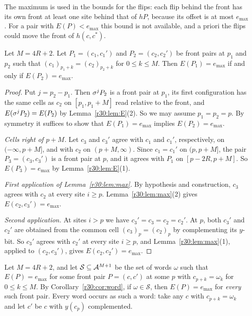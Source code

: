The maximum is used in the bounds for the flips: each flip behind the front has its own front at least one site behind that of $hP$, because its offset is at most $e_{\max}$. For a pair with $E(P)<e_{\max}$ this bound is not available, and a priori the flips could move the front of $h(c,c^*)$.

\begin{corollary}\label{r30:cor:word}
Let $M=4R+2$. Let $P_1=(c_1,c_1')$ and $P_2=(c_2,c_2')$ be front pairs at $p_1$ and $p_2$ such that $(c_1)_{p_1+k}=(c_2)_{p_2+k}$ for $0\le k\le M$. Then $E(P_1)=e_{\max}$ if and only if $E(P_2)=e_{\max}$.
\end{corollary}

\begin{proof}
Put $j=p_2-p_1$. Then $\sigma^jP_2$ is a front pair at $p_1$, its first configuration has the same cells as $c_2$ on $[p_1,p_1+M]$ read relative to the front, and $E(\sigma^jP_2)=E(P_2)$ by Lemma~\ref{r30:lem:E}(2). So we may assume $p_1=p_2=p$. By symmetry it suffices to show that $E(P_1)=e_{\max}$ implies $E(P_2)=e_{\max}$.

\emph{Cells right of $p+M$.} Let $c_3$ and $c_3'$ agree with $c_1$ and $c_1'$, respectively, on $(-\infty,p+M]$, and with $c_2$ on $(p+M,\infty)$. Since $c_1=c_1'$ on $(p,p+M]$, the pair $P_3=(c_3,c_3')$ is a front pair at $p$, and it agrees with $P_1$ on $[p-2R,p+M]$. So $E(P_3)=e_{\max}$ by Lemma~\ref{r30:lem:E}(1).

\emph{First application of Lemma~\ref{r30:lem:max}.} By hypothesis and construction, $c_3$ agrees with $c_2$ at every site $i\ge p$. Lemma~\ref{r30:lem:max}(2) gives $E(c_2,c_3')=e_{\max}$.

\emph{Second application.} At sites $i>p$ we have $c_3'=c_3=c_2=c_2'$. At $p$, both $c_3'$ and $c_2'$ are obtained from the common cell $(c_3)_p=(c_2)_p$ by complementing its $y$-bit. So $c_3'$ agrees with $c_2'$ at every site $i\ge p$, and Lemma~\ref{r30:lem:max}(1), applied to $(c_2,c_3')$, gives $E(c_2,c_2')=e_{\max}$.
\end{proof}

Let $M=4R+2$, and let $\mathcal{S}\subseteq\mathcal{A}^{M+1}$ be the set of words $\omega$ such that $E(P)=e_{\max}$ for some front pair $P=(c,c')$ at some $p$ with $c_{p+k}=\omega_k$ for $0\le k\le M$. By Corollary~\ref{r30:cor:word}, if $\omega\in\mathcal{S}$, then $E(P)=e_{\max}$ for \emph{every} such front pair. Every word occurs as such a word: take any $c$ with $c_{p+k}=\omega_k$ and let $c'$ be $c$ with $y(c_p)$ complemented.

